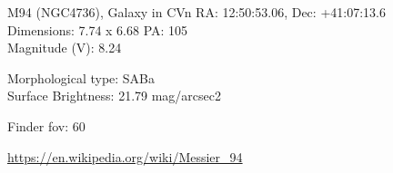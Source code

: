 \begin{block}{M94 (NGC4736), Galaxy in CVn}
    RA: 12:50:53.06, Dec: +41:07:13.6 \\ 
    Dimensions: 7.74 x 6.68 PA: 105 \\ 
    Magnitude (V): 8.24

    Morphological type: SABa \\ 
    Surface Brightness: 21.79 mag/arcsec2 


    Finder fov: 60 

    \url{https://en.wikipedia.org/wiki/Messier_94} 
\end{block}